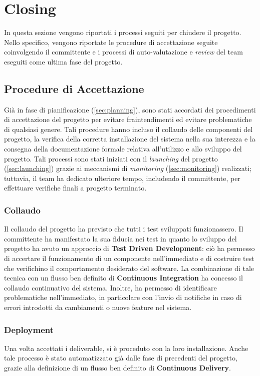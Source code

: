 \section{Closing}
\label{sec:closing}

In questa sezione vengono riportati i processi seguiti per chiudere il progetto. Nello specifico, vengono riportate le procedure di accettazione seguite coinvolgendo il committente e i processi di auto-valutazione e \textit{review} del team eseguiti come ultima fase del progetto.

\subsection{Procedure di Accettazione}
Già in fase di pianificazione (\ref{sec:planning}), sono stati accordati dei procedimenti di accettazione del progetto per evitare fraintendimenti ed evitare problematiche di qualsiasi genere. Tali procedure hanno incluso il collaudo delle componenti del progetto, la verifica della corretta installazione del sistema nella sua interezza e la consegna della documentazione formale relativa all'utilizzo e allo sviluppo del progetto. Tali processi sono stati iniziati con il \textit{launching} del progetto (\ref{sec:launching}) grazie ai meccanismi di \textit{monitoring} (\ref{sec:monitoring}) realizzati; tuttavia, il team ha dedicato ulteriore tempo, includendo il committente, per effettuare verifiche finali a progetto terminato.

\subsubsection{Collaudo}
Il collaudo del progetto ha previsto che tutti i test sviluppati funzionassero. Il committente ha manifestato la sua fiducia nei test in quanto lo sviluppo del progetto ha avuto un approccio di \textbf{Test Driven Development}: ciò ha permesso di accertare il funzionamento di un componente nell'immediato e di costruire test che verifichino il comportamento desiderato del software. La combinazione di tale tecnica con un flusso ben definito di \textbf{Continuous Integration} ha concesso il collaudo continuativo del sistema. Inoltre, ha permesso di identificare problematiche nell'immediato, in particolare con l'invio di notifiche in caso di errori introdotti da cambiamenti o nuove feature nel sistema.

\subsubsection{Deployment}
Una volta accettati i deliverable, si è proceduto con la loro installazione. Anche tale processo è stato automatizzato già dalle fase di precedenti del progetto, grazie alla definizione di un flusso ben definito di \textbf{Continuous Delivery}.

